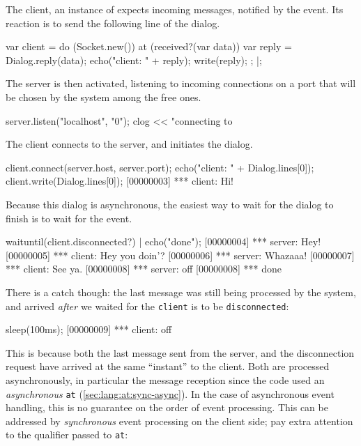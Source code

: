 The client, an instance of  expects incoming messages,
notified by the  event.  Its reaction is to send the
following line of the dialog.

\begin{urbiscript}
var client =
  do (Socket.new())
  {
    at (received?(var data))
    {
      var reply = Dialog.reply(data);
      echo("client: " + reply);
      write(reply);
    };
  }|;
\end{urbiscript}

The server is then activated, listening to incoming connections on a port
that will be chosen by the system among the free ones.

\begin{urbiscript}
server.listen("localhost", "0");
clog << "connecting to %
\end{urbiscript}

The client connects to the server, and initiates the dialog.

\begin{urbiscript}
client.connect(server.host, server.port);
echo("client: " + Dialog.lines[0]);
client.write(Dialog.lines[0]);
[00000003] *** client: Hi!
\end{urbiscript}

Because this dialog is asynchronous, the easiest way to wait for the dialog
to finish is to wait for the  event.

\begin{urbiscript}
waituntil(client.disconnected?) | echo("done");
[00000004] *** server: Hey!
[00000005] *** client: Hey you doin'?
[00000006] *** server: Whazaaa!
[00000007] *** client: See ya.
[00000008] *** server: off
[00000008] *** done
\end{urbiscript}

There is a catch though: the last message was still being processed by the
system, and arrived \emph{after} we waited for the \lstinline{client} is to
be \lstinline{disconnected}:

\begin{urbiscript}
sleep(100ms);
[00000009] *** client: off
\end{urbiscript}

This is because both the last message sent from the server, and the
disconnection request have arrived at the same ``instant'' to the client.
Both are processed asynchronously, in particular the message reception since
the code used an \emph{asynchronous} \lstinline{at}
(\autoref{sec:lang:at:sync-async}).  In the case of asynchronous event
handling, this is no guarantee on the order of event processing.  This can
be addressed by \emph{synchronous} event processing on the client side; pay
extra attention to the  qualifier passed to \lstinline{at}:

